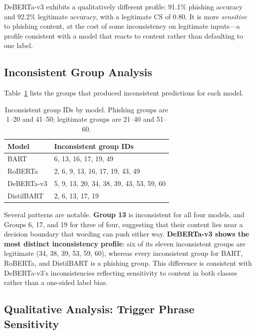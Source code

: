 \documentclass[11pt]{article}
\begin{document}
DeBERTa-v3 exhibits a qualitatively different profile: 91.1\% phishing accuracy and 92.2\% legitimate accuracy, with a legitimate CS of 0.80. It is more \textit{sensitive} to phishing content, at the cost of some inconsistency on legitimate inputs---a profile consistent with a model that reacts to content rather than defaulting to one label.

\subsection{Inconsistent Group Analysis}
\label{sec:inconsistent}

Table~\ref{tab:inconsistent} lists the groups that produced inconsistent predictions for each model.

\begin{table}[h]
\centering
\small
\caption{Inconsistent group IDs by model. Phishing groups are 1--20 and 41--50; legitimate groups are 21--40 and 51--60.}
\label{tab:inconsistent}
\setlength{\tabcolsep}{8pt}
\begin{tabular}{lp{9cm}}
\toprule
\textbf{Model} & \textbf{Inconsistent group IDs} \\
\midrule
BART       & 6, 13, 16, 17, 19, 49 \\
RoBERTa    & 2, 6, 9, 13, 16, 17, 19, 43, 49 \\
DeBERTa-v3 & 5, 9, 13, 20, 34, 38, 39, 43, 53, 59, 60 \\
DistilBART & 2, 6, 13, 17, 19 \\
\bottomrule
\end{tabular}
\end{table}

Several patterns are notable. \textbf{Group 13} is inconsistent for all four models, and Groups 6, 17, and 19 for three of four, suggesting that their content lies near a decision boundary that wording can push either way. \textbf{DeBERTa-v3 shows the most distinct inconsistency profile}: six of its eleven inconsistent groups are legitimate (34, 38, 39, 53, 59, 60), whereas every inconsistent group for BART, RoBERTa, and DistilBART is a phishing group. This difference is consistent with DeBERTa-v3's inconsistencies reflecting sensitivity to content in both classes rather than a one-sided label bias.

\subsection{Qualitative Analysis: Trigger Phrase Sensitivity}
\label{sec:qualitative}
\end{document}
